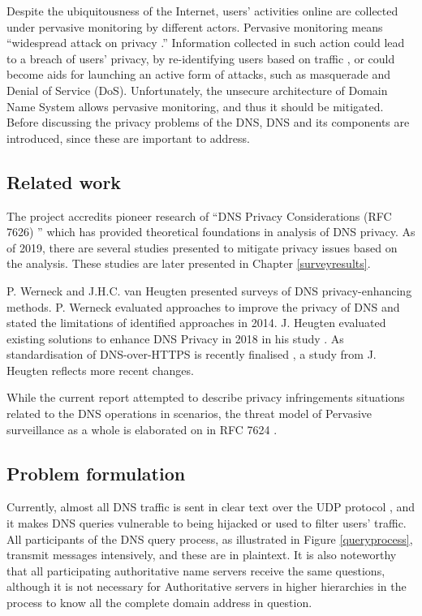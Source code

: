 \documentclass[a4paper,12pt]{article}
\begin{document}
Despite the ubiquitousness of the Internet, users' activities online are collected under pervasive monitoring by different actors.
Pervasive monitoring means ``widespread attack on privacy \cite{rfc7258}.'' Information collected in such action could lead to a breach of users’ privacy, by re-identifying users based on traffic \cite{herrmann2010analyzing}, or could become aids for launching an active form of attacks, such as masquerade and Denial of Service (DoS).
Unfortunately, the unsecure architecture of Domain Name System allows pervasive monitoring, and thus it should be mitigated.
Before discussing the privacy problems of the DNS, DNS and its components are introduced, since these are important to address.



\subsection{Related work}
The project accredits pioneer research of ``DNS Privacy Considerations (RFC 7626) \cite{rfc7626}'' which has provided theoretical foundations in analysis of DNS privacy. 
As of 2019, there are several studies presented to mitigate privacy issues based on the analysis. These studies are later presented in Chapter \ref{surveyresults}.

P. Werneck and J.H.C. van Heugten presented surveys of DNS privacy-enhancing methods. P. Werneck evaluated approaches to improve the privacy of DNS and stated the limitations of identified approaches \cite{werneck2014dns} in 2014. J. Heugten evaluated existing solutions to enhance DNS Privacy in 2018 in his study \cite{van2018privacy}. As standardisation of DNS-over-HTTPS is recently finalised \cite{rfc8484}, a study from J. Heugten reflects more recent changes.

While the current report attempted to describe privacy infringements situations related to the DNS operations in scenarios, the threat model of Pervasive surveillance as a whole is elaborated on in RFC 7624 \cite{rfc7624}.

\subsection{Problem formulation}\label{problemformulation}
Currently, almost all DNS traffic is sent in clear text \cite{rfc7626} over the UDP protocol \cite{tcp2014analysis}, and it makes DNS queries vulnerable to being hijacked or used to filter users' traffic.
All participants of the DNS query process, as illustrated in Figure \ref{queryprocess}, transmit messages intensively, and these are in plaintext.
It is also noteworthy that all participating authoritative name servers receive the same questions, although it is not necessary for Authoritative servers in higher hierarchies in the process to know all the complete domain address in question.
\end{document}
